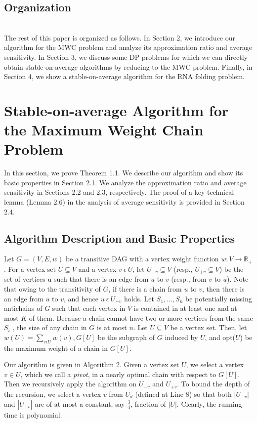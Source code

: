\documentclass[preprint, 11pt]{article}
\begin{document}
\subsection{Organization}
\\
The rest of this paper is organized as follows. In Section 2, we introduce our algorithm for the
MWC problem and analyze its approximation ratio and average sensitivity. In Section 3, we discuss
some DP problems for which we can directly obtain stable-on-average algorithms by reducing to the
MWC problem. Finally, in Section 4, we show a stable-on-average algorithm for the RNA folding
problem.
\section{Stable-on-average Algorithm for the Maximum Weight Chain
Problem}
In this section, we prove Theorem 1.1. We describe our algorithm and show its basic properties in
Section 2.1. We analyze the approximation ratio and average sensitivity in Sections 2.2 and 2.3,
respectively. The proof of a key technical lemma (Lemma 2.6) in the analysis of average sensitivity
is provided in Section 2.4.
\subsection{Algorithm Description and Basic Properties}
Let $G = (V, E, w)$ be a transitive DAG with a vertex weight function $w : V \rightarrow \mathbb{R}_+$. For a vertex
set $U \subseteq V$ and a vertex $v \ \epsilon \ U$, let $U_{-v} \subseteq V$ (resp., $U_{+v} \subseteq V$) be the set of vertices u such that
there is an edge from $u$ to $v$ (resp., from $v$ to $u$). Note that owing to the transitivity of $G$, if there
is a chain from $u$ to $v$, then there is an edge from $u$ to $v$, and hence $u \ \epsilon \ U_{-v}$ holds. Let $S_1, \ldots, S_n$ be potentially missing antichains of $G$ such that each vertex in $V$ is contained in at least one and
at most $K$ of them. Because a chain cannot have two or more vertices from the same $S_i$
, the size
of any chain in $G$ is at most $n$. Let $U \subseteq V$ be a vertex set. Then, let $w(U) = \sum_{v\epsilon U} w(v), G[U]$ be
the subgraph of $G$ induced by $U$, and opt($U$) be the maximum weight of a chain in $G[U]$.

Our algorithm is given in Algorithm 2. Given a vertex set $U$, we select a vertex $v ∈ U$, which
we call a \textit{pivot}, in a nearly optimal chain with respect to $G[U]$. Then we recursively apply the
algorithm on $U_{-v}$ and $U_{+v}$. To bound the depth of the recursion, we select a vertex $v$ from $U_d$
(defined at Line 8) so that both $|U_{-v}|$ and $|U_{+v}|$ are of at most a constant, say $\frac{3}{4}$, fraction of $|U|$. Clearly, the running time is polynomial.
\end{document}
